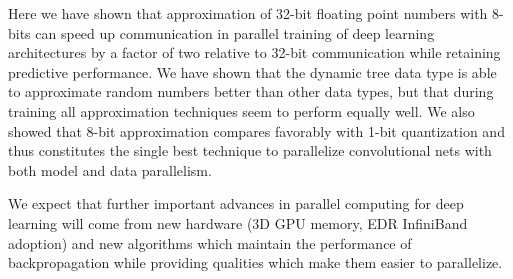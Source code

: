 \documentclass{article} %
\begin{document}
Here we have shown that approximation of 32-bit floating point numbers with 8-bits can speed up communication in parallel training of deep learning architectures by a factor of two relative to 32-bit communication while retaining predictive performance. We have shown that the dynamic tree data type is able to approximate random numbers better than other data types, but that during training all approximation techniques seem to perform equally well. We also showed that 8-bit approximation compares favorably with 1-bit quantization and thus constitutes the single best technique to parallelize convolutional nets with both model and data parallelism.

We expect that further important advances in parallel computing for deep learning will come from new hardware (3D GPU memory, EDR InfiniBand adoption) and new algorithms which maintain the performance of backpropagation while providing qualities which make them easier to parallelize. 



\end{document}
